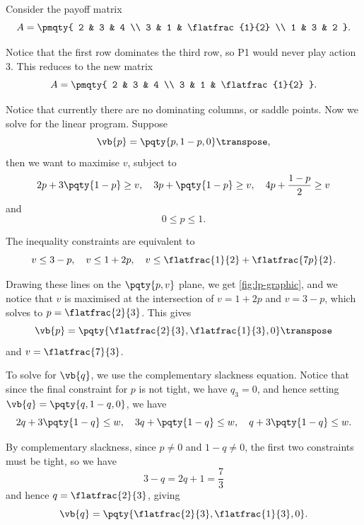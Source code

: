 \begin{example}
    Consider the payoff matrix
    \[
        A = \pmqty{
            2 & 3 & 4 \\
            3 & 1 & \flatfrac{1}{2} \\
            1 & 3 & 2
        }.
    \]

    Notice that the first row dominates the third row, so P1 would never play action 3. This reduces to the new matrix
    \[
        A = \pmqty{
            2 & 3 & 4 \\
            3 & 1 & \flatfrac{1}{2}
        }.
    \]

    Notice that currently there are no dominating columns, or saddle points. Now we solve for the linear program. Suppose
    \[
        \vb{p} = \pqty{p, 1 - p, 0}\transpose,
    \]
    then we want to maximise \(v\), subject to
    \[
        2p + 3 \pqty{1 - p} \geq v, \quad 3p + \pqty{1 - p} \geq v, \quad 4p + \frac{1 - p}{2} \geq v
    \]
    and
    \[
        0 \leq p \leq 1.
    \]

    The inequality constraints are equivalent to
    \[
        v \leq 3 - p, \quad v \leq 1 + 2p, \quad v \leq \flatfrac{1}{2} + \flatfrac{7p}{2}.
    \]

    Drawing these lines on the \(\pqty{p, v}\) plane, we get \autoref{fig:lp-graphic}, and we notice that \(v\) is maximised at the intersection of \(v = 1 + 2p\) and \(v = 3 - p\), which solves to \(p = \flatfrac{2}{3}\). This gives
    \[
        \vb{p} = \pqty{\flatfrac{2}{3}, \flatfrac{1}{3}, 0}\transpose
    \]
    and \(v = \flatfrac{7}{3}\).
    
    To solve for \(\vb{q}\), we use the complementary slackness equation. Notice that since the final constraint for \(p\) is not tight, we have \(q_3 = 0\), and hence setting \(\vb{q} = \pqty{q, 1 - q, 0}\), we have
    \[
        2q + 3 \pqty{1 - q} \leq w, \quad 3q + \pqty{1 - q} \leq w, \quad q + 3 \pqty{1 - q} \leq w.
    \]

    By complementary slackness, since \(p \neq 0\) and \(1 - q \neq 0\), the first two constraints must be tight, so we have
    \[
        3 - q = 2q + 1 = \frac{7}{3}
    \]
    and hence \(q = \flatfrac{2}{3}\), giving
    \[
        \vb{q} = \pqty{\flatfrac{2}{3}, \flatfrac{1}{3}, 0}.
    \]
\end{example}


